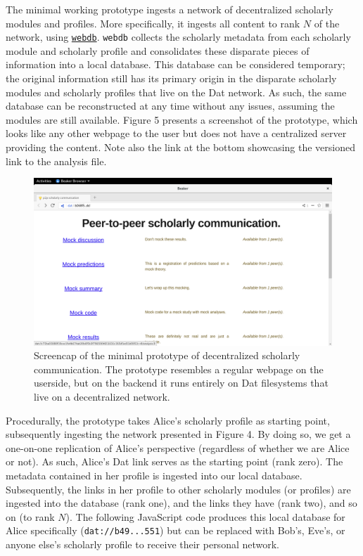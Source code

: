 \documentclass[a4paper]{article}
\begin{document}
The minimal working prototype ingests a network of decentralized
scholarly modules and profiles. More specifically, it ingests all
content to rank \(N\) of the network, using
\href{https://github.com/beakerbrowser/webdb}{\texttt{webdb}}.
\texttt{webdb} collects the scholarly metadata from each scholarly
module and scholarly profile and consolidates these disparate pieces of
information into a local database. This database can be considered
temporary; the original information still has its primary origin in the
disparate scholarly modules and scholarly profiles that live on the Dat
network. As such, the same database can be reconstructed at any time
without any issues, assuming the modules are still available. Figure 5
presents a screenshot of the prototype, which looks like any other
webpage to the user but does not have a centralized server providing the
content. Note also the link at the bottom showcasing the versioned link
to the analysis file.

\begin{figure}

{\centering \includegraphics[width=1\linewidth]{assets/fig5} 

}

\caption{Screencap of the minimal prototype of decentralized scholarly communication. The prototype resembles a regular webpage on the userside, but on the backend it runs entirely on Dat filesystems that live on a decentralized network.}\label{fig:unnamed-chunk-8}
\end{figure}

Procedurally, the prototype takes Alice's scholarly profile as starting
point, subsequently ingesting the network presented in Figure 4. By
doing so, we get a one-on-one replication of Alice's perspective
(regardless of whether we are Alice or not). As such, Alice's Dat link
serves as the starting point (rank zero). The metadata contained in her
profile is ingested into our local database. Subsequently, the links in
her profile to other scholarly modules (or profiles) are ingested into
the database (rank one), and the links they have (rank two), and so on
(to rank \(N\)). The following JavaScript code produces this local
database for Alice specifically (\texttt{dat://b49...551}) but can be
replaced with Bob's, Eve's, or anyone else's scholarly profile to
receive their personal network.
\end{document}
